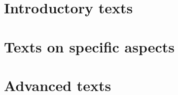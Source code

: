 \documentclass[paper=a4,10pt,div=17,headsepline,BCOR=12mm,twoside,open=right]{scrbook}\usepackage{knitr}
\begin{document}
\section{Introductory texts}

\nocite{Dalgaard2008,Zuur2009,Teetor2011}

\section{Texts on specific aspects}

\nocite{Chang2013,Fox2002,Fox2010,Faraway2004,Faraway2006,Everitt2011}

\section{Advanced texts}

\nocite{Xie2013,wickham2015,wickham2014advanced,Pinheiro2000,Murrell2011,Matloff2011,Ihaka1996}

\printbibliography
\end{document}
